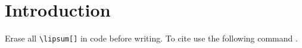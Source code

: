 \section{Introduction}
Erase all \verb+\lipsum[]+ in code before writing. To cite use the following command \cite{knuthwebsite}.

\lipsum[2]